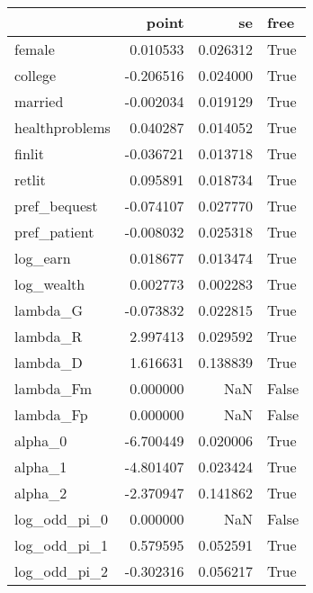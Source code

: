 \begin{tabular}{lrrl}
\toprule
{} &     point &        se &   free \\
\midrule
female         &  0.010533 &  0.026312 &   True \\
college        & -0.206516 &  0.024000 &   True \\
married        & -0.002034 &  0.019129 &   True \\
healthproblems &  0.040287 &  0.014052 &   True \\
finlit         & -0.036721 &  0.013718 &   True \\
retlit         &  0.095891 &  0.018734 &   True \\
pref\_bequest   & -0.074107 &  0.027770 &   True \\
pref\_patient   & -0.008032 &  0.025318 &   True \\
log\_earn       &  0.018677 &  0.013474 &   True \\
log\_wealth     &  0.002773 &  0.002283 &   True \\
lambda\_G       & -0.073832 &  0.022815 &   True \\
lambda\_R       &  2.997413 &  0.029592 &   True \\
lambda\_D       &  1.616631 &  0.138839 &   True \\
lambda\_Fm      &  0.000000 &       NaN &  False \\
lambda\_Fp      &  0.000000 &       NaN &  False \\
alpha\_0        & -6.700449 &  0.020006 &   True \\
alpha\_1        & -4.801407 &  0.023424 &   True \\
alpha\_2        & -2.370947 &  0.141862 &   True \\
log\_odd\_pi\_0   &  0.000000 &       NaN &  False \\
log\_odd\_pi\_1   &  0.579595 &  0.052591 &   True \\
log\_odd\_pi\_2   & -0.302316 &  0.056217 &   True \\
\bottomrule
\end{tabular}
